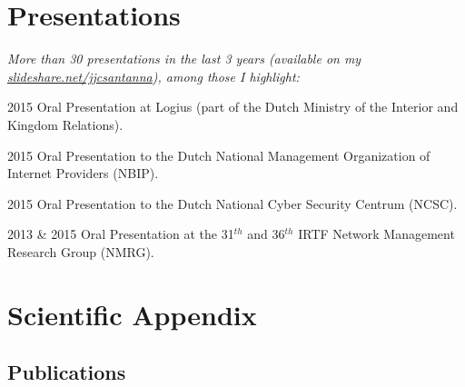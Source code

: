 \documentclass[print]{friggeri-cv} %
\begin{document}
\section{Presentations}
\emph{More than 30 presentations in the last 3 years (available on my  \href{http://www.slideshare.net/jjcsantanna}{slideshare.net/jjcsantanna}), among those I highlight:}

\begin{entrylist}

\vspace{-0.3cm}
\entry
{2015}
{Oral Presentation}
{at Logius (part of the Dutch Ministry of the Interior and Kingdom Relations).}

\vspace{-0.3cm}
\entry
{2015}
{Oral Presentation}
{to the Dutch National Management Organization of Internet Providers (NBIP).}

\vspace{-0.3cm}
\entry
{2015}
{Oral Presentation}
{to the Dutch National Cyber Security Centrum (NCSC).}

\vspace{-0.3cm}
\entry
{2013 \& 2015}
{Oral Presentation}
{at the 31$^{th}$ and 36$^{th}$ IRTF Network Management Research Group (NMRG).}

\end{entrylist}


\newpage
\section{Scientific Appendix}

\subsection{Publications}
\nocite{*}
\printbibliography[title={\emptyset}]
\end{document}
